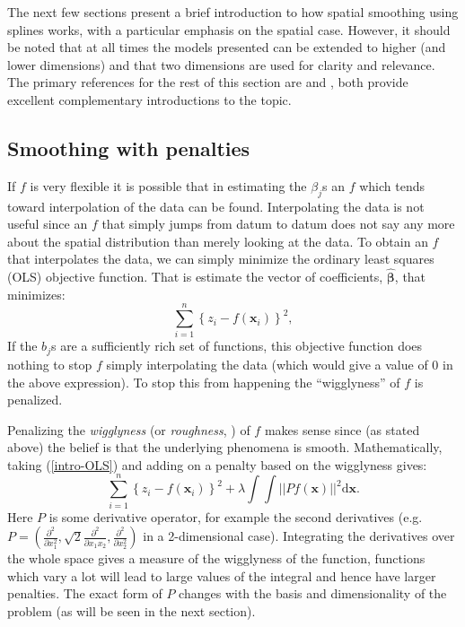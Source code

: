 The next few sections present a brief introduction to how spatial smoothing using splines works, with a particular emphasis on the spatial case. However, it should be noted that at all times the models presented can be extended to higher (and lower dimensions) and that two dimensions are used for clarity and relevance. The primary references for the rest of this section are  and , both provide excellent complementary introductions to the topic.

\subsection{Smoothing with penalties}
\label{GAMpenalties}

If $f$ is very flexible it is possible that in estimating the $\beta_j$s an $f$ which tends toward interpolation of the data can be found. Interpolating the data is not useful since an $f$ that simply jumps from datum to datum does not say any more about the spatial distribution than merely looking at the data. To obtain an $f$ that interpolates the data, we can simply minimize the ordinary least squares (OLS) objective function. That is estimate the vector of coefficients, $\hat{\bm{\beta}}$, that minimizes:
\begin{equation}
\sum_{i=1}^n \left \{ z_i - f(\mathbf{x}_i) \right \}^2,
\label{intro-OLS}
\end{equation}
If the $b_j$s are a sufficiently rich set of functions, this objective function does nothing to stop $f$ simply interpolating the data (which would give a value of 0 in the above expression). To stop this from happening the ``wigglyness'' of $f$ is penalized.

Penalizing the \textit{wigglyness} (or \textit{roughness}, \cite{rwc}) of $f$ makes sense since (as stated above) the belief is that the underlying phenomena is smooth. Mathematically, taking (\ref{intro-OLS}) and adding on a penalty based on the wigglyness gives:
\begin{equation}
\sum_{i=1}^n \left \{ z_i - f(\mathbf{x}_i) \right \}^2 +  \lambda \int\int \lvert \lvert P f(\mathbf{x}) \rvert \rvert^2 \text{d}\mathbf{x}.
\label{intro-2d-objfcn}
\end{equation}
Here $P$ is some derivative operator, for example the second derivatives (e.g. $P=\left ( \frac{\partial^2}{\partial x_1^2}, \sqrt{2} \frac{\partial^2}{\partial x_1 x_2}, \frac{\partial^2}{\partial x_2^2}\right )$ in a 2-dimensional case). Integrating the derivatives over the whole space gives a measure of the wigglyness of the function, functions which vary a lot will lead to large values of the integral and hence have larger penalties. The exact form of $P$ changes with the basis and dimensionality of the problem (as will be seen in the next section).

